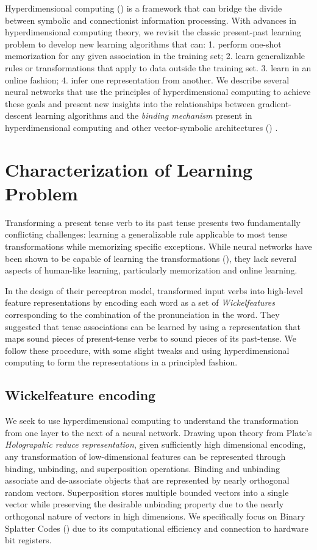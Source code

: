 \documentclass{article}
\begin{document}
Hyperdimensional computing (\citet{Kanerva2009}) is a framework that can bridge the divide between symbolic and connectionist information processing. With advances in hyperdimensional computing theory, we revisit the classic present-past learning problem to develop new learning algorithms that can: 1. perform one-shot memorization for any given association in the training set; 2. learn generalizable rules or transformations that apply to data outside the training set. 3. learn in an online fashion; 4. infer one representation from another. We describe several neural networks that use the principles of hyperdimensional computing to achieve these goals and present new insights into the relationships between gradient-descent learning algorithms and the \emph{binding mechanism} present in hyperdimensional computing and other vector-symbolic architectures (\citet{Gayler2003}) .

\section{Characterization of Learning Problem}

Transforming a present tense verb to its past tense presents two fundamentally conflicting challenges: learning a generalizable rule applicable to most tense transformations while memorizing specific exceptions. While neural networks have been shown to be capable of learning the transformations (\citet{MacWhinney1991}), they lack several aspects of human-like learning, particularly memorization and online learning. 

In the design of their perceptron model, \citet{Rumelhart1986} transformed input verbs into high-level feature representations by encoding each word as a set of \emph{Wickelfeatures} corresponding to the combination of the pronunciation in the word. They suggested that tense associations can be learned by using a representation that maps sound pieces of present-tense verbs to sound pieces of its past-tense. We follow these procedure, with some slight tweaks and using hyperdimensional computing to form the representations in a principled fashion.

\subsection{Wickelfeature encoding}

We seek to use hyperdimensional computing to understand the transformation from one layer to the next of a neural network. Drawing upon theory from Plate's \emph{Holograpahic reduce representation}, given sufficiently high dimensional encoding, any transformation of low-dimensional features can be represented through binding, unbinding, and superposition operations. Binding and unbinding associate and de-associate objects that are represented by nearly orthogonal random vectors. Superposition stores multiple bounded vectors into a single vector while preserving the desirable unbinding property due to the nearly orthogonal nature of vectors in high dimensions. We specifically focus on Binary Splatter Codes (\citet{Kanerva1994}) due to its computational efficiency and connection to hardware bit registers. 
\end{document}
